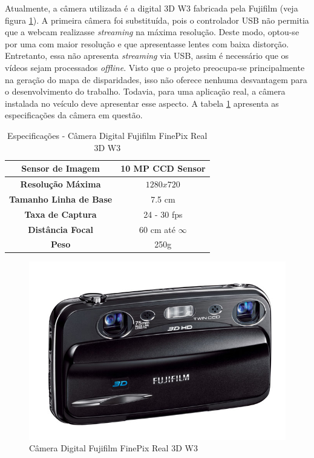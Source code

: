 Atualmente, a câmera utilizada é a digital 3D W3 fabricada pela Fujifilm (veja figura \ref{fujiW3}). A primeira câmera foi substituída, pois o controlador USB não permitia que a webcam realizasse \textit{streaming} na máxima resolução. Deste modo, optou-se por uma com maior resolução e que apresentasse lentes com baixa distorção. Entretanto, essa não apresenta \textit{streaming} via USB, assim é necessário que os vídeos sejam processados \textit{offline}. Visto que o projeto preocupa-se principalmente na geração do mapa de disparidades, isso não oferece nenhuma desvantagem para o desenvolvimento do trabalho. Todavia, para uma aplicação real, a câmera instalada no veículo deve apresentar esse aspecto. A tabela \ref{fujiW3_tab} apresenta as especificações da câmera em questão.

\begin{table}[]
\centering
\caption{Especificações - Câmera Digital Fujifilm FinePix Real 3D W3}
\label{fujiW3_tab}
\begin{tabular}{|c|c|}
\hline
\textbf{Sensor de Imagem}      & 10 MP CCD Sensor  	\\	\hline
\textbf{Resolução Máxima}      & $1280x720$        	\\	\hline
\textbf{Tamanho Linha de Base} & 7.5 cm             	\\	\hline
\textbf{Taxa de Captura}      & 24 - 30 fps          	\\	\hline
\textbf{Distância Focal}       & 60 cm até $\infty$	\\	\hline
\textbf{Peso}       		      & 250g		\\	\hline
\end{tabular}
\end{table}

\begin{figure}[H]
	\centering
	\includegraphics[scale=0.35]{./Resources/fujiW3.jpg}
	\caption{Câmera Digital Fujifilm FinePix Real 3D W3}
	\label{fujiW3}
\end{figure}


